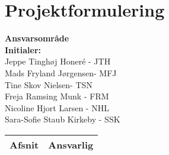 \chapter{Projektformulering}




\textbf{Ansvarsområde} \\
\textbf{Initialer: } \\
Jeppe Tinghøj Honeré - JTH \\
Mads Fryland Jørgensen- MFJ \\
Tine Skov Nielsen- TSN \\
Freja Ramsing Munk - FRM \\
Nicoline Hjort Larsen - NHL \\
Sara-Sofie Staub Kirkeby - SSK \\[2ex]


\begin{longtabu} to 
    Afsnit &    Ansvarlig\\[-1ex]
    \midrule
     
    
    

\end{longtabu}